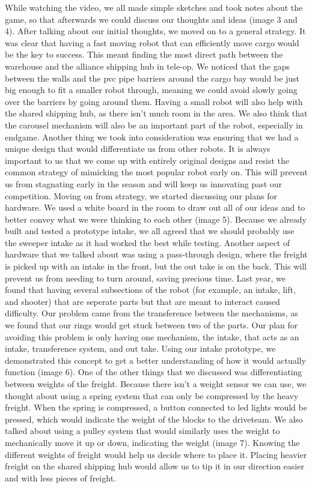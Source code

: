 While watching the video, we all made simple sketches and took notes about the game, so that afterwards we could discuss our thoughts and ideas (image 3 and 4). After talking about our initial thoughts, we moved on to a general strategy. It was clear that having a fast moving robot that can efficiently move cargo would be the key to success. This meant finding the most direct path between the warehouse and the alliance shipping hub in tele-op. We noticed that the gaps between the walls and the pvc pipe barriers around the cargo bay would be just big enough to fit a smaller robot through, meaning we could avoid slowly going over the barriers by going around them. Having a small robot will also help with the shared shipping hub, as there isn’t much room in the area. We also think that the carousel mechanism will also be an important part of the robot, especially in endgame. Another thing we took into consideration was ensuring that we had a unique design that would differentiate us from other robots. It is always important to us that we come up with entirely original designs and resist the common strategy of mimicking the most popular robot early on. This will prevent us from stagnating early in the season and will keep us innovating past our competition.
Moving on from strategy, we started discussing our plans for hardware. We used a white board in the room to draw out all of our ideas and to better convey what we were thinking to each other (image 5). Because we already built and tested a prototype intake, we all agreed that we should probably use the sweeper intake as it had worked the best while testing. Another aspect of hardware that we talked about was using a pass-through design, where the freight is picked up with an intake in the front, but the out take is on the back. This will prevent us from needing to turn around, saving precious time. Last year, we found that having several subsections of the robot (for example, an intake, lift, and shooter) that are seperate parts but that are meant to interact caused difficulty. Our problem came from the transference between the mechanisms, as we found that our rings would get stuck between two of the parts. Our plan for avoiding this problem is only having one mechanism, the intake, that acts as an intake, transference system, and out take. Using our intake prototype, we demonstrated this concept to get a better understanding of how it would actually function (image 6).  One of the other things that we discussed was differentiating between weights of the freight. Because there isn’t a weight sensor we can use, we thought about using a spring system that can only be compressed by the heavy freight. When the spring is compressed, a button connected to led lights would be pressed, which would indicate the weight of the blocks to the driveteam. We also talked about using a pulley system that would similarly uses the weight to mechanically move it up or down, indicating the weight (image 7). Knowing the different weights of freight would help us decide where to place it. Placing heavier freight on the shared shipping hub would allow us to tip it in our direction easier and with less pieces of freight. 
